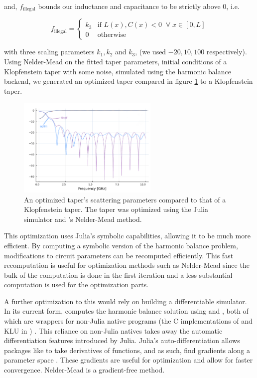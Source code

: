 and, $f_{\text{illegal}}$ bounds our inductance and capacitance to be strictly above $0$, i.e.

$$f_{\text{illegal}} = \begin{cases}
        k_3 & \text{if } L(x), C(x) < 0\;\; \forall\; x\in [0, L]\\
        0 & \text{otherwise }
    \end{cases}
$$

with three scaling parameters $k_1, k_2$ and $k_3$, (we used $-20, 10, 100$ respectively). Using
Nelder-Mead on the fitted taper parameters, initial conditions of a Klopfenstein taper with some noise, 
simulated using the harmonic balance backend, we 
generated an optimized taper compared in figure \ref{fig:taper_optim} to a Klopfenstein taper.

\begin{figure}
    \centering
    \includegraphics[width=0.6\textwidth]{figs/optim_taper_preliminary_results copy.png}
    \caption{An optimized taper's scattering parameters compared to that of a Klopfenstein taper. The taper
    was optimized using the Julia simulator and 's Nelder-Mead method.}
    \label{fig:taper_optim}
\end{figure}

This optimization uses Julia's symbolic capabilities, allowing it to be much more efficient.
By computing a symbolic version of the harmonic balance problem, modifications to circuit
parameters can be recomputed efficiently. This fast recomputation is useful for optimization
methods such as Nelder-Mead since the bulk of the computation is done in the first iteration
and a less substantial computation is used for the optimization parts.

A further optimization to this would rely on building a differentiable simulator.
In its current form,  computes the harmonic balance
solution using  and , both of which are wrappers for
non-Julia native programs (the C implementations of
 and KLU in ) \cite{fftwjl, klujl, 
fftw, klu}. This reliance on non-Julia natives takes away the automatic differentiation
features introduced by Julia. Julia's auto-differentiation allows packages like 
to take derivatives of functions, and as such, find gradients along a parameter space \cite{fluxjl}. 
These gradients are useful for optimization and allow for faster convergence. Nelder-Mead
is a gradient-free method.

